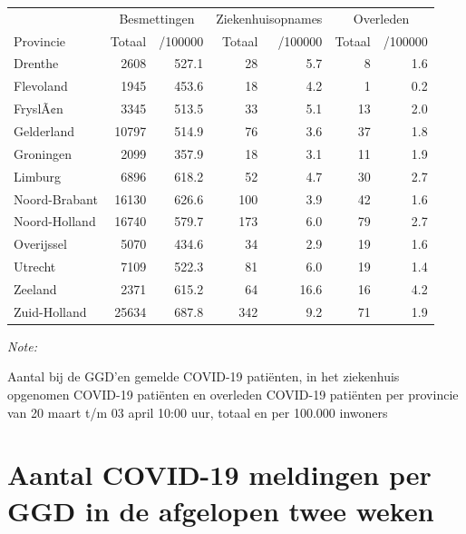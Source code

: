 \documentclass[
  english,
  man,floatsintext]{apa6}
\begin{document}
\begin{table}
\centering
\begin{threeparttable}
\begin{tabular}{lrrrrrr}
\toprule
\multicolumn{1}{c}{ } & \multicolumn{2}{c}{Besmettingen} & \multicolumn{2}{c}{Ziekenhuisopnames} & \multicolumn{2}{c}{Overleden} \\
\cmidrule(l{3pt}r{3pt}){2-3} \cmidrule(l{3pt}r{3pt}){4-5} \cmidrule(l{3pt}r{3pt}){6-7}
Provincie & Totaal & /100000 & Totaal & /100000 & Totaal & /100000\\
\midrule
Drenthe & 2608 & 527.1 & 28 & 5.7 & 8 & 1.6\\
Flevoland & 1945 & 453.6 & 18 & 4.2 & 1 & 0.2\\
FryslÃ¢n & 3345 & 513.5 & 33 & 5.1 & 13 & 2.0\\
Gelderland & 10797 & 514.9 & 76 & 3.6 & 37 & 1.8\\
Groningen & 2099 & 357.9 & 18 & 3.1 & 11 & 1.9\\
Limburg & 6896 & 618.2 & 52 & 4.7 & 30 & 2.7\\
Noord-Brabant & 16130 & 626.6 & 100 & 3.9 & 42 & 1.6\\
Noord-Holland & 16740 & 579.7 & 173 & 6.0 & 79 & 2.7\\
Overijssel & 5070 & 434.6 & 34 & 2.9 & 19 & 1.6\\
Utrecht & 7109 & 522.3 & 81 & 6.0 & 19 & 1.4\\
Zeeland & 2371 & 615.2 & 64 & 16.6 & 16 & 4.2\\
Zuid-Holland & 25634 & 687.8 & 342 & 9.2 & 71 & 1.9\\
\bottomrule
\end{tabular}
\begin{tablenotes}
\item \textit{Note: } 
\item Aantal bij de GGD’en gemelde COVID-19 patiënten, in het ziekenhuis opgenomen COVID-19 patiënten en overleden COVID-19 patiënten per provincie van 20 maart t/m 03 april 10:00 uur, totaal en per 100.000 inwoners
\end{tablenotes}
\end{threeparttable}
\end{table}

\newpage

\hypertarget{aantal-covid-19-meldingen-per-ggd-in-de-afgelopen-twee-weken}{%
\section{Aantal COVID-19 meldingen per GGD in de afgelopen twee weken}\label{aantal-covid-19-meldingen-per-ggd-in-de-afgelopen-twee-weken}}
\end{document}
